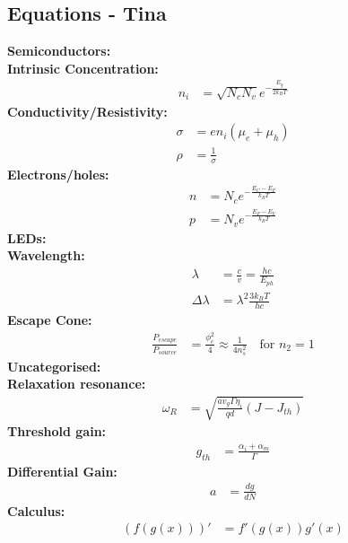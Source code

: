 \documentclass[landscape,a4paper]{article}
\begin{document}
\begin{multicols}{3}
	\section{Equations - Tina}
	\textbf{Semiconductors:}\\
	\hspace{3mm}\textbf{Intrinsic Concentration:}
	\begin{align}
		n_i &= \sqrt{N_c N_v} e^{-\frac{E_g}{2 k_B T}}
	\end{align}
	\hspace{3mm}\textbf{Conductivity/Resistivity:}
	\begin{align}
		\sigma &= e n_i (\mu_e + \mu_h)\\
		\rho &= \frac{1}{\sigma}
	\end{align}
	\hspace{3mm}\textbf{Electrons/holes:}
	\begin{align}
		n &= N_c e^{-\frac{E_C - E_F}{k_B T}}\\
		p &= N_v e^{-\frac{E_F - E_V}{k_B T}}
	\end{align}
	\textbf{LEDs:}\\
	\hspace{3mm}\textbf{Wavelength:}
	\begin{align}
		\lambda &= \frac{c}{v} = \frac{hc}{E_{ph}}\\
		\Delta \lambda &= \lambda^2 \frac{3 k_B T}{hc}
	\end{align}
	\hspace{3mm}\textbf{Escape Cone:}
	\begin{align}
		\frac{P_{escape}}{P_{source}} &= \frac{\phi_c^2}{4} \approx \frac{1}{4n_s^2}\quad \text{for } n_2=1
	\end{align}
	\textbf{Uncategorised:}\\
	\hspace{3mm}\textbf{Relaxation resonance:}
	\begin{align}
		\omega_R &= \sqrt{\frac{a v_g \Gamma \eta_i}{qd} (J-J_{th})}
	\end{align}
	\hspace{3mm}\textbf{Threshold gain:}
	\begin{align}
		g_{th} &= \frac{\alpha_i + \alpha_m}{\Gamma}
	\end{align}
	\hspace{3mm}\textbf{Differential Gain:}
	\begin{align}
		a &= \frac{dg}{dN}
	\end{align}
	\textbf{Calculus:}
	\begin{align}
		(f(g(x)))' &= f'(g(x))g'(x)
	\end{align}
\end{multicols}
\end{document}
